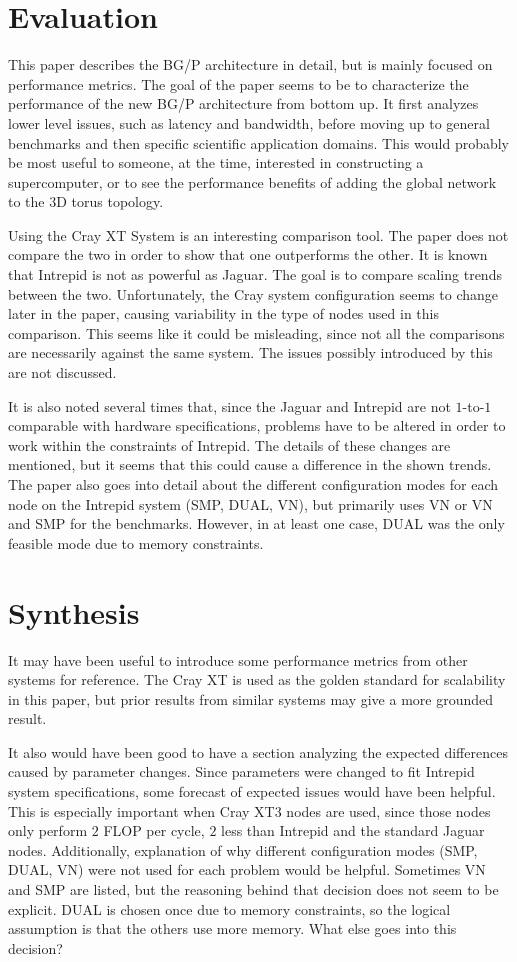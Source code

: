 \documentclass[11pt]{article}
\newcommand{\?}{\stackrel{?}{=}}
\begin{document}
\section{Evaluation}
This paper describes the BG/P architecture in detail, but is mainly focused
on performance metrics. The goal of the paper seems to be to characterize the 
performance of the new BG/P architecture from bottom up. It first analyzes
lower level issues, such as latency and bandwidth, before moving up to general
benchmarks and then specific scientific application domains. This would probably
be most useful to someone, at the time, interested in constructing a supercomputer,
or to see the performance benefits of adding the global network to the $3$D torus
topology.

Using the Cray XT System is an interesting comparison tool. The paper does not 
compare the two in order to show that one outperforms the other. It is known that
Intrepid is not as powerful as Jaguar. The goal is to compare scaling trends
between the two. Unfortunately, the Cray system configuration seems to change
later in the paper, causing variability in the type of nodes used in this comparison.
This seems like it could be misleading, since not all the comparisons are necessarily
against the same system. The issues possibly introduced by this are not discussed.

It is also noted several times that, since the Jaguar and Intrepid are not 
$1$-to-$1$ comparable with hardware specifications, problems have to be altered
in order to work within the constraints of Intrepid. The details of these 
changes are mentioned, but it seems that this could cause a difference in the
shown trends. The paper also goes into detail about the different configuration modes for 
each node on the Intrepid system (SMP, DUAL, VN), but primarily uses VN or 
VN and SMP for the benchmarks. However, in at least one case, DUAL was the only
feasible mode due to memory constraints. 

\section{Synthesis}
It may have been useful to introduce some performance metrics from other systems
for reference. The Cray XT is used as the golden standard for scalability in this
paper, but prior results from similar systems may give a more grounded result.

It also would have been good to have a section analyzing the expected differences
caused by parameter changes. Since parameters were changed to fit Intrepid
system specifications, some forecast of expected issues would have been helpful.
This is especially important when Cray XT3 nodes are used, since those nodes
only perform $2$ FLOP per cycle, $2$ less than Intrepid and the standard Jaguar 
nodes.
Additionally, explanation of why different configuration modes (SMP, DUAL, VN)
were not used for each problem would be helpful. Sometimes VN and SMP are listed,
but the reasoning behind that decision does not seem to be explicit. DUAL is 
chosen once due to memory constraints, so the logical assumption is that the
others use more memory. What else goes into this decision?

\newpage

\nocite{*}
\end{document}
